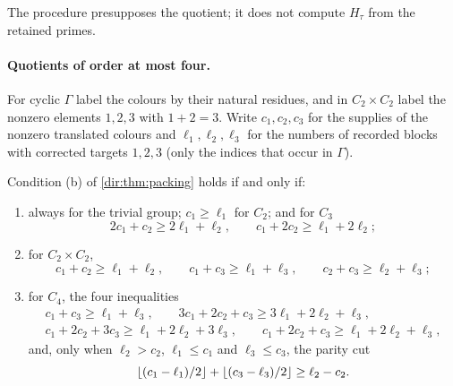 The procedure presupposes the quotient; it does not compute $H_\tau$ from the retained primes.

\paragraph{Quotients of order at most four.}
For cyclic $\Gamma$ label the colours by their natural residues, and in $C_2\times C_2$ label the nonzero
elements $1,2,3$ with $1+2=3$. Write $c_1,c_2,c_3$ for the supplies of the nonzero translated colours and
$\ell_1,\ell_2,\ell_3$ for the numbers of recorded blocks with corrected targets $1,2,3$ (only the indices
that occur in $\Gamma$).

\begin{theorem}\label{dir:thm:smallquotients}
Condition \textup{(b)} of \cref{dir:thm:packing} holds if and only if:
\begin{enumerate}[label=\textup{(\alph*)}]
\item always for the trivial group; $c_1\ge\ell_1$ for $C_2$; and for $C_3$
\[
 2c_1+c_2\ge2\ell_1+\ell_2,\qquad c_1+2c_2\ge\ell_1+2\ell_2 ;
\]
\item for $C_2\times C_2$,
\begin{equation}\label{dir:eq:klein}
 c_1+c_2\ge\ell_1+\ell_2,\qquad c_1+c_3\ge\ell_1+\ell_3,\qquad c_2+c_3\ge\ell_2+\ell_3 ;
\end{equation}
\item for $C_4$, the four inequalities
\begin{equation}\label{dir:eq:cyclic4}
\begin{gathered}
 c_1+c_3\ge\ell_1+\ell_3,\qquad 3c_1+2c_2+c_3\ge3\ell_1+2\ell_2+\ell_3,\\
 c_1+2c_2+3c_3\ge\ell_1+2\ell_2+3\ell_3,\qquad c_1+2c_2+c_3\ge\ell_1+2\ell_2+\ell_3,
\end{gathered}
\end{equation}
and, only when $\ell_2>c_2$, $\ell_1\le c_1$ and $\ell_3\le c_3$, the parity cut
\begin{equation}\label{dir:eq:paritycut}
 \lfloor(c_1-\ell_1)/2\rfloor+\lfloor(c_3-\ell_3)/2\rfloor\ge\ell_2-c_2 .
\end{equation}
\end{enumerate}
\end{theorem}

